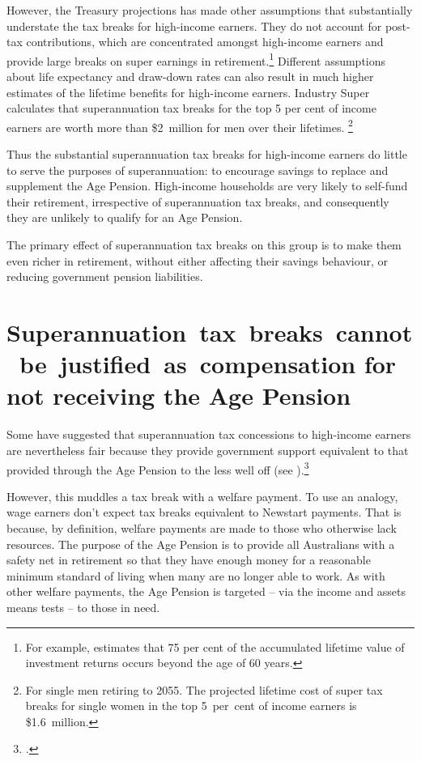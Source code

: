 However, the Treasury projections has made other assumptions that substantially understate the tax breaks for high-income earners. They do not account for post-tax contributions, which are concentrated amongst high-income earners and provide large breaks on super earnings in retirement.\footnote{For example, \textcite{Blayney2015} estimates that 75 per cent of the accumulated lifetime value of investment returns occurs beyond the age of 60 years.}  Different assumptions about life expectancy and draw-down rates can also result in much higher estimates of the lifetime benefits for high-income earners.  Industry Super calculates that superannuation tax breaks for the top 5 per cent of income earners are worth more than \$2~million for men over their lifetimes.%
\footnote{For single men retiring to 2055. The projected lifetime cost of super tax breaks for single women in the top 5~per~cent of income earners is \$1.6~million.} 

Thus the substantial superannuation tax breaks for high-income earners do little to serve the purposes of superannuation: to encourage savings to replace and supplement the Age Pension. High-income households are very likely to self-fund their retirement, irrespective of superannuation tax breaks, and consequently they are unlikely to qualify for an Age Pension. 

The primary effect of superannuation tax breaks on this group is to make them even richer in retirement, without either affecting their savings behaviour, or reducing government pension liabilities.

\section{\mbox{Superannuation tax breaks cannot be justified as compensation} for not receiving the Age Pension}\label{sec:SUPER-3-6}
Some have suggested that superannuation tax concessions to high-income earners are nevertheless fair because they provide government support equivalent to that provided through the Age Pension to the less well off (see ).\footcite[][46]{ASFA2015TreasurySubmission}  

However, this muddles a tax break with a welfare payment. To use an analogy, wage earners don’t expect tax breaks equivalent to Newstart payments. That is because, by definition, welfare payments are made to those who otherwise lack resources. The purpose of the Age Pension is to provide all Australians with a safety net in retirement so that they have enough money for a reasonable minimum standard of living when many are no longer able to work. As with other welfare payments, the Age Pension is targeted – via the income and assets means tests – to those in need. 


